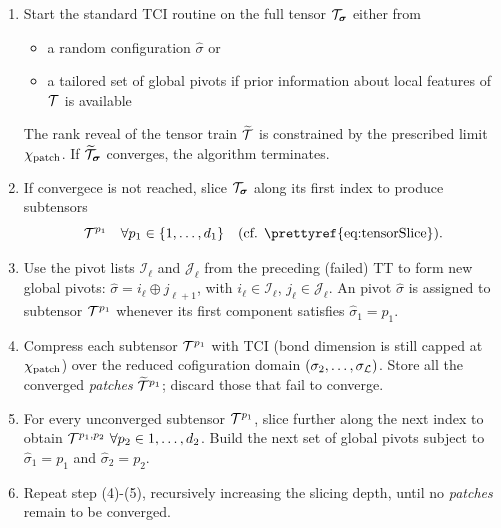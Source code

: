 \begin{enumerate}
	\item Start the standard TCI routine on the full tensor $\mathcal{T}_{\boldsymbol{\sigma}}$ either from
	\begin{itemize}
		\item a random configuration $\hat{\sigma}$ or
		\item a tailored set of global pivots if prior information about local features of $\mathcal{T}$ is available
	\end{itemize}
	The rank reveal of the tensor train $\widetilde{\mathcal{T}}$ is constrained by the prescribed limit $\chi_{\text{patch}}$. If $\widetilde{\mathcal{T}}_{\boldsymbol{\sigma}}$ converges, the algorithm terminates. 
	\item If convergece is not reached, slice $\mathcal{T}_{\boldsymbol{\sigma}}$ along its first index to produce subtensors 
	$$\mT^{p_1}\quad \forall p_1 \in \{1,\dots,d_1\}\quad \text{(cf. \prettyref{eq:tensorSlice}).}$$
	\item Use the pivot lists $\mathcal{I}_\ell$ and $\mathcal{J}_\ell$ from the preceding (failed) TT to form new global pivots: $\hat{\sigma} = i_\ell \oplus j_{\ell +1}$, with $i_\ell \in \mathcal{I}_\ell$, $j_\ell \in \mathcal{J}_\ell$. 
	An pivot $\hat{\sigma}$ is assigned to subtensor $\mathcal{T}^{p_1}$ whenever its first component satisfies $\hat{\sigma}_1 = p_1$.
	\item Compress each subtensor $\mathcal{T}^{p_1}$ with TCI  (bond dimension is still capped at $\chi_{\text{patch}}$) over the reduced cofiguration domain $(\sigma_2, \dots, \sigma_{\mathcal{L}})$.  Store all the converged \textit{patches} $\widetilde{\mathcal{T}}^{p_1}$; discard those that fail to converge. 
	\item For every unconverged subtensor $\mathcal{T}^{p_1}$, slice further along the next index to obtain $\mathcal{T}^{p_1, p_2}\  \forall p_2\in {1,\dots,d_2}$. Build the next set of global pivots subject to $\hat{\sigma}_1 = p_1$ and $\hat{\sigma}_2 = p_2$.
	\item Repeat step (4)-(5), recursively increasing the slicing depth, until no \textit{patches} remain to be converged. 
\end{enumerate}
\endgroup

